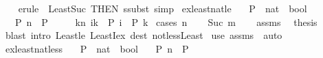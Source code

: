 \begin{isabellebody}
%
\isadelimproof
\ \ %
\endisadelimproof
%
\isatagproof
{}\isamarkupfalse%
\ {\isacharparenleft}{\kern0pt}erule\ {\isacharparenleft}{\kern0pt}{}{\isacharparenright}{\kern0pt}\ Least{\isacharunderscore}{\kern0pt}Suc\ {\isacharbrackleft}{\kern0pt}THEN\ ssubst{\isacharbrackright}{\kern0pt}{\isacharparenright}{\kern0pt}\ simp%
\endisatagproof
{\isafoldproof}%
%
\isadelimproof
\isanewline
%
\endisadelimproof
\isanewline
{}\isamarkupfalse%
\ ex{\isacharunderscore}{\kern0pt}least{\isacharunderscore}{\kern0pt}nat{\isacharunderscore}{\kern0pt}le{\isacharcolon}{\kern0pt}\isanewline
\ \ \ P\ {\isacharcolon}{\kern0pt}{\isacharcolon}{\kern0pt}\ {\isachardoublequoteopen}nat\ {\isasymRightarrow}\ bool{\isachardoublequoteclose}\isanewline
\ \ \ {\isachardoublequoteopen}P\ n{\isachardoublequoteclose}\ {\isachardoublequoteopen}{\isasymnot}\ P\ {}{\isachardoublequoteclose}\ \isanewline
\ \ \ {\isachardoublequoteopen}{\isasymexists}k{\isasymle}n{\isachardot}{\kern0pt}\ {\isacharparenleft}{\kern0pt}{\isasymforall}i{\isacharless}{\kern0pt}k{\isachardot}{\kern0pt}\ {\isasymnot}\ P\ i{\isacharparenright}{\kern0pt}\ {\isasymand}\ P\ k{\isachardoublequoteclose}\isanewline
%
\isadelimproof
%
\endisadelimproof
%
\isatagproof
{}\isamarkupfalse%
\ {\isacharparenleft}{\kern0pt}cases\ n{\isacharparenright}{\kern0pt}\isanewline
\ \ \isamarkupfalse%
\ {\isacharparenleft}{\kern0pt}Suc\ m{\isacharparenright}{\kern0pt}\isanewline
\ \ \isamarkupfalse%
\ assms\ \isamarkupfalse%
\ {\isacharquery}{\kern0pt}thesis\isanewline
\ \ \ \ \isamarkupfalse%
\ {\isacharparenleft}{\kern0pt}blast\ intro{\isacharcolon}{\kern0pt}\ Least{\isacharunderscore}{\kern0pt}le\ LeastI{\isacharunderscore}{\kern0pt}ex\ dest{\isacharcolon}{\kern0pt}\ not{\isacharunderscore}{\kern0pt}less{\isacharunderscore}{\kern0pt}Least{\isacharparenright}{\kern0pt}\isanewline
{}\isamarkupfalse%
\ {\isacharparenleft}{\kern0pt}use\ assms\ \ auto{\isacharparenright}{\kern0pt}%
\endisatagproof
{\isafoldproof}%
%
\isadelimproof
\isanewline
%
\endisadelimproof
\isanewline
{}\isamarkupfalse%
\ ex{\isacharunderscore}{\kern0pt}least{\isacharunderscore}{\kern0pt}nat{\isacharunderscore}{\kern0pt}less{\isacharcolon}{\kern0pt}\isanewline
\ \ \ P\ {\isacharcolon}{\kern0pt}{\isacharcolon}{\kern0pt}\ {\isachardoublequoteopen}nat\ {\isasymRightarrow}\ bool{\isachardoublequoteclose}\isanewline
\ \ \ {\isachardoublequoteopen}P\ n{\isachardoublequoteclose}\ {\isachardoublequoteopen}{\isasymnot}\ P\ {}{\isachardoublequoteclose}\ \isanewline

\end{isabellebody}
